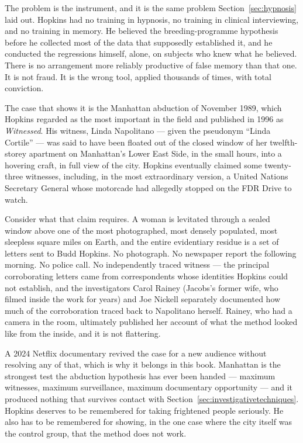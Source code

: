 \setlength{\figwraprise}{\baselineskip}%
The problem is the instrument, and it is the same problem Section~\ref{sec:hypnosis} laid out.
Hopkins had no training in hypnosis, no training in clinical interviewing, and no training in
memory. He believed the breeding-programme hypothesis before he collected most of the data that
supposedly established it, and he conducted the regressions himself, alone, on subjects who
knew what he believed. There is no arrangement more reliably productive of false memory than
that one. It is not fraud. It is the wrong tool, applied thousands of times, with total
conviction.

The case that shows it is the Manhattan abduction of November 1989, which Hopkins regarded as
the most important in the field and published in 1996 as \emph{Witnessed}. His witness, Linda
Napolitano --- given the pseudonym ``Linda Cortile'' --- was said to have been floated out of
the closed window of her twelfth-storey apartment on Manhattan's Lower East Side, in the small
hours, into a hovering craft, in full view of the city. Hopkins eventually claimed some
twenty-three witnesses, including, in the most extraordinary version, a United Nations Secretary
General whose motorcade had allegedly stopped on the FDR Drive to watch.

Consider what that claim requires. A woman is levitated through a sealed window above one of
the most photographed, most densely populated, most sleepless square miles on Earth, and the
entire evidentiary residue is a set of letters sent to Budd Hopkins. No photograph. No
newspaper report the following morning. No police call. No independently traced witness --- the
principal corroborating letters came from correspondents whose identities Hopkins could not
establish, and the investigators Carol Rainey (Jacobs's former wife, who filmed inside the work
for years) and Joe Nickell separately documented how much of the corroboration traced back to
Napolitano herself. Rainey, who had a camera in the room, ultimately published her account of
what the method looked like from the inside, and it is not flattering.

A 2024 Netflix documentary revived the case for a new audience without resolving any of that,
which is why it belongs in this book. Manhattan is the strongest test the abduction hypothesis
has ever been handed --- maximum witnesses, maximum surveillance, maximum documentary
opportunity --- and it produced nothing that survives contact with
Section~\ref{sec:investigativetechniques}. Hopkins deserves to be remembered for taking
frightened people seriously. He also has to be remembered for showing, in the one case where
the city itself was the control group, that the method does not work.

